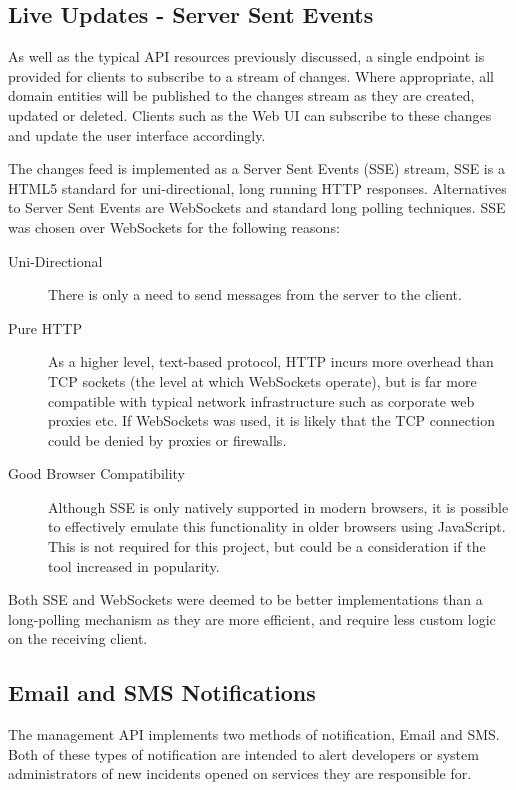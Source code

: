 \documentclass{cshonours}
\begin{document}
\subsection{Live Updates - Server Sent Events}

As well as the typical API resources previously discussed, a single endpoint is provided for clients to subscribe to a stream of changes. Where appropriate, all domain entities will be published to the changes stream as they are created, updated or deleted. Clients such as the Web UI can subscribe to these changes and update the user interface accordingly.

The changes feed is implemented as a Server Sent Events (SSE) stream, SSE is a HTML5 standard for uni-directional, long running HTTP responses. Alternatives to Server Sent Events are WebSockets and standard long polling techniques. SSE was chosen over WebSockets for the following reasons:

\begin{description}
  \item[Uni-Directional] There is only a need to send messages from the server to the client.
  \item[Pure HTTP] As a higher level, text-based protocol, HTTP incurs more overhead than TCP sockets (the level at which WebSockets operate), but is far more compatible with typical network infrastructure such as corporate web proxies etc. If WebSockets was used, it is likely that the TCP connection could be denied by proxies or firewalls.
  \item[Good Browser Compatibility] Although SSE is only natively supported in modern browsers, it is possible to effectively emulate this functionality in older browsers using JavaScript. This is not required for this project, but could be a consideration if the tool increased in popularity.
\end{description}

Both SSE and WebSockets were deemed to be better implementations than a long-polling mechanism as they are more efficient, and require less custom logic on the receiving client.

\pagebreak
\subsection{Email and SMS Notifications}

The management API implements two methods of notification, Email and SMS. Both of these types of notification are intended to alert developers or system administrators of new incidents opened on services they are responsible for.
\end{document}
